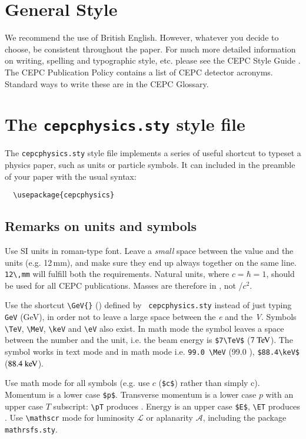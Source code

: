 \documentclass[11pt,a4paper]{cepcnote}
\begin{document}
\section{General Style}

We recommend the use of British English. However, whatever you decide
to choose, be consistent throughout the paper. For much more detailed
information on writing, spelling and typographic style, etc. please
see the CEPC Style Guide \cite{}. The CEPC Publication Policy
contains a list of CEPC detector acronyms. Standard ways to write
these are in the CEPC Glossary.

\section{The {\tt cepcphysics.sty} style file}
\label{app:CepcPhysicsSty}

The {\tt cepcphysics.sty} style file implements a series of useful
shortcut to typeset a physics paper, such as units or particle
symbols. It can included in the preamble of your paper with the usual
syntax:

\begin{verbatim}
  \usepackage{cepcphysics}
\end{verbatim}

\subsection{Remarks on units and symbols}

Use SI units in roman-type font. Leave a \emph{small} space between
the value and the units (e.g. 12\,mm), and make sure they end up
always together on the same line. \verb|12\,mm| will fulfill both the
requirements. Natural units, where $c=\hbar=1$, should be used for all
CEPC publications. Masses are therefore in \GeV, not \GeV/$c^2$.

Use the shortcut \verb|\GeV{}| (\GeV{}) defined by {\tt
cepcphysics.sty} instead of just typing \verb|GeV| (GeV), in order
not to leave a large space between the \emph{e} and the
\emph{V}. Symbols \verb|\TeV|, \verb|\MeV|, \verb|\keV| and \verb|\eV|
also exist. In math mode the symbol leaves a space between the number
and the unit, i.e. the beam energy is \verb+$7\TeV$+ ($7\TeV$). The
symbol works in text mode and in math mode i.e. \verb+99.0 \MeV+
(99.0 \MeV), \verb+$88.4\keV$+ ($88.4\keV$).

Use math mode for all symbols (e.g. use $c$ (\verb|$c$|) rather than
simply c). Momentum is a lower case \verb+$p$+. Transverse momentum is
a lower case $p$ with an upper case $T$ subscript: \verb|\pT| produces
\pT. Energy is an upper case \verb+$E$+, \verb+\ET+ produces \ET.  Use
\verb|\mathscr| mode for luminosity $\mathscr{L}$ or aplanarity
$\mathscr{A}$, including the package \verb|mathrsfs.sty|.
\end{document}
